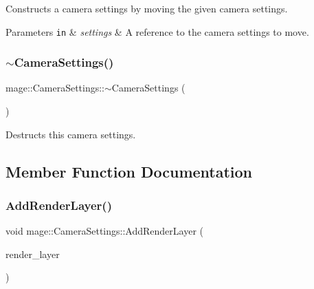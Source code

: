 Constructs a camera settings by moving the given camera settings.


\begin{DoxyParams}[1]{Parameters}
\mbox{\tt in}  & {\em settings} & A reference to the camera settings to move. \\
\hline
\end{DoxyParams}
\hypertarget{classmage_1_1_camera_settings_a738a93dc2e1aed2cac7a58af658984f3}{}\label{classmage_1_1_camera_settings_a738a93dc2e1aed2cac7a58af658984f3} 
\subsubsection{\texorpdfstring{$\sim$\+Camera\+Settings()}{~CameraSettings()}}
{\footnotesize\ttfamily mage\+::\+Camera\+Settings\+::$\sim$\+Camera\+Settings (\begin{DoxyParamCaption}{ }\end{DoxyParamCaption})\hspace{0.3cm}{\ttfamily [default]}}

Destructs this camera settings. 

\subsection{Member Function Documentation}
\hypertarget{classmage_1_1_camera_settings_ab1dca8b8f52daf55614592e0bb640ae9}{}\label{classmage_1_1_camera_settings_ab1dca8b8f52daf55614592e0bb640ae9} 
\subsubsection{\texorpdfstring{Add\+Render\+Layer()}{AddRenderLayer()}}
{\footnotesize\ttfamily void mage\+::\+Camera\+Settings\+::\+Add\+Render\+Layer (\begin{DoxyParamCaption}\item[{\hyperlink{namespacemage_a4091cc4d4d64a0fd31fd96c2ef7af761}{Render\+Layer}}]{render\+\_\+layer }\end{DoxyParamCaption})\hspace{0.3cm}{\ttfamily [noexcept]}}

